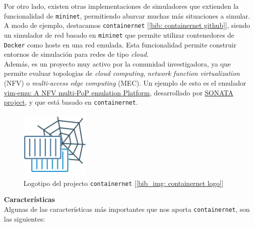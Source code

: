 \documentclass[12pt]{article}
\begin{document}
	\noindent Por otro lado, existen otras implementaciones de simuladores que extienden la funcionalidad de \texttt{mininet}, permitiendo abarcar muchas más situaciones a simular. A modo de ejemplo, destacamos \texttt{containernet} [\ref{bib: containernet github}], siendo un simulador de red basado en \texttt{mininet} que permite utilizar contenedores de \texttt{Docker} como hosts en una red emulada. Esta funcionalidad permite construir entornos de simulación para redes de tipo \textit{cloud}. \\
	
	\noindent Además, es un proyecto muy activo por la comunidad investigadora, ya que permite evaluar topologias de \textit{cloud computing}, \textit{network function virtualization} (NFV) o \textit{multi-access edge computing} (MEC). Un ejemplo de esto es el emulador \href{https://github.com/containernet/vim-emu}{vim-emu: A NFV multi-PoP emulation Platform}, desarrollado por \href{https://www.sonata-nfv.eu/}{SONATA project}, y que está basado en \texttt{containernet}.
	
	\begin{figure}[h!]
		\begin{center}
			\includegraphics[width=0.3\textwidth]{img/containernet_logo.png}
			\caption{Logotipo del projecto \texttt{containernet} [\ref{bib_img: containernet logo}]}	
		\end{center}
	\end{figure}

	\vspace{10px}
	
	\noindent \textbf{\large Características}\\
	
	\noindent Algunas de las características más importantes que nos aporta \texttt{containernet}, son las siguientes:
	
\end{document}
